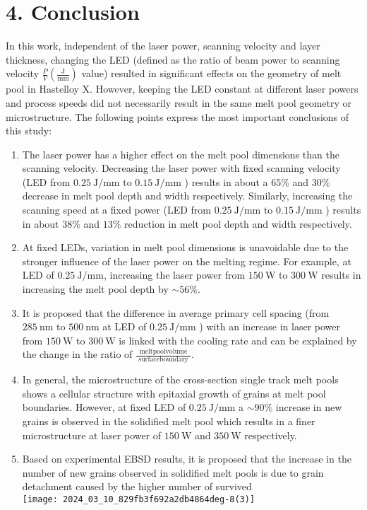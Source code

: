 \documentclass[10pt]{article}
\begin{document}
\section*{4. Conclusion}
In this work, independent of the laser power, scanning velocity and layer thickness, changing the LED (defined as the ratio of beam power to scanning velocity $\frac{P}{V}\left(\frac{\mathrm{J}}{\mathrm{mm}}\right)$ value) resulted in significant effects on the geometry of melt pool in Hastelloy X. However, keeping the LED constant at different laser powers and process speeds did not necessarily result in the same melt pool geometry or microstructure. The following points express the most important conclusions of this study:

\begin{enumerate}
  \item The laser power has a higher effect on the melt pool dimensions than the scanning velocity. Decreasing the laser power with fixed scanning velocity (LED from $0.25 \mathrm{~J} / \mathrm{mm}$ to $0.15 \mathrm{~J} / \mathrm{mm}$ ) results in about a $65 \%$ and $30 \%$ decrease in melt pool depth and width respectively. Similarly, increasing the scanning speed at a fixed power (LED from $0.25 \mathrm{~J} / \mathrm{mm}$ to $0.15 \mathrm{~J} / \mathrm{mm}$ ) results in about $38 \%$ and $13 \%$ reduction in melt pool depth and width respectively.

  \item At fixed LEDs, variation in melt pool dimensions is unavoidable due to the stronger influence of the laser power on the melting regime. For example, at LED of $0.25 \mathrm{~J} / \mathrm{mm}$, increasing the laser power from $150 \mathrm{~W}$ to $300 \mathrm{~W}$ results in increasing the melt pool depth by $\sim 56 \%$.

  \item It is proposed that the difference in average primary cell spacing (from $285 \mathrm{~nm}$ to $500 \mathrm{~nm}$ at LED of $0.25 \mathrm{~J} / \mathrm{mm}$ ) with an increase in laser power from $150 \mathrm{~W}$ to $300 \mathrm{~W}$ is linked with the cooling rate and can be explained by the change in the ratio of $\frac{\text { meltpoolvolume }}{\text { surfaceboundary }}$.

  \item In general, the microstructure of the cross-section single track melt pools shows a cellular structure with epitaxial growth of grains at melt pool boundaries. However, at fixed LED of $0.25 \mathrm{~J} / \mathrm{mm}$ a $\sim 90 \%$ increase in new grains is observed in the solidified melt pool which results in a finer microstructure at laser power of $150 \mathrm{~W}$ and $350 \mathrm{~W}$ respectively.

  \item Based on experimental EBSD results, it is proposed that the increase in the number of new grains observed in solidified melt pools is due to grain detachment caused by the higher number of survived\\
\texttt{[image: 2024\_03\_10\_829fb3f692a2db4864deg-8(3)]}

\end{enumerate}
\end{document}
